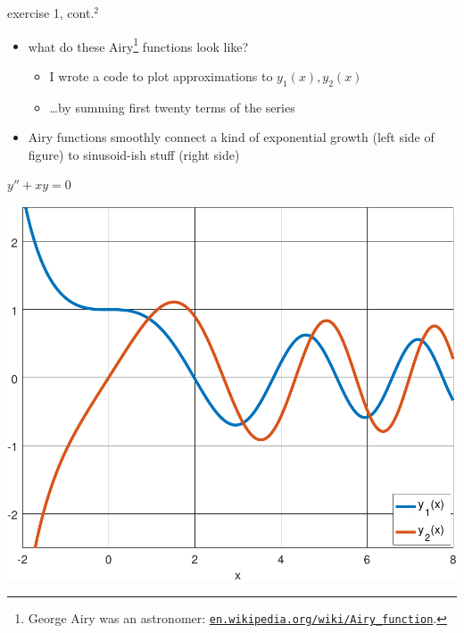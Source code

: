 \documentclass[urlcolor=blue,dvipsnames]{beamer}
\begin{document}
\begin{frame}{exercise 1, cont.$^2$}

\begin{itemize}
\item what do these Airy\footnote{George Airy was an astronomer: \href{https://en.wikipedia.org/wiki/Airy_function}{\scriptsize \texttt{en.wikipedia.org/wiki/Airy\_function}}.} functions look like?
    \begin{itemize}
    \item I wrote a code to plot approximations to $y_1(x),y_2(x)$
    \item \dots by summing first twenty terms of the series
    \end{itemize}
\item Airy functions smoothly connect a kind of exponential growth (left side of figure) to sinusoid-ish stuff (right side)
\end{itemize}

\begin{center}
\begin{minipage}[t]{0.3\textwidth} \vspace{0mm} $y''+xy=0$\end{minipage}
\qquad\quad
\begin{minipage}[t]{0.55\textwidth} \vspace{-3mm} \includegraphics[width=\textwidth]{figs/airyplots} \end{minipage}
\end{center}
\end{frame}
\end{document}
